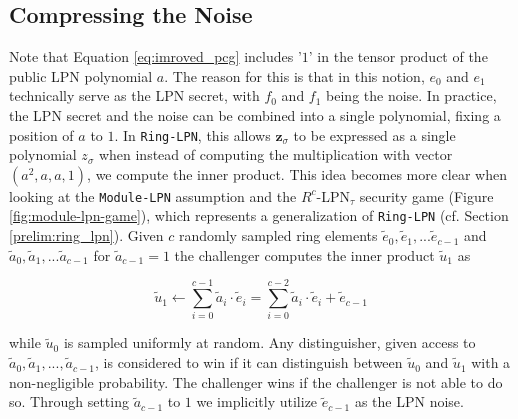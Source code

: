 \subsection{Compressing the Noise}
Note that Equation \ref{eq:imroved_pcg} includes '$1$' in the tensor product of the public LPN polynomial $a$. The reason for this is that in this notion, $e_0$ and $e_1$ technically serve as the LPN secret, with $f_0$ and $f_1$ being the noise. In practice, the LPN secret and the noise can be combined into a single polynomial, fixing a position of $a$ to $1$. In \texttt{Ring-LPN}, this allows $\mathbf{z}_\sigma$ to be expressed as a single polynomial $z_\sigma$ when instead of computing the multiplication with vector $(a^2, a, a, 1)$, we compute the inner product. This idea becomes more clear when looking at the \texttt{Module-LPN} assumption and the $R^{c}$-LPN$_{\tau}$ security game (Figure \ref{fig:module-lpn-game}), which represents a generalization of \texttt{Ring-LPN} (cf. Section \ref{prelim:ring_lpn}). Given $c$ randomly sampled ring elements $\tilde{e}_0, \tilde{e}_1, ... \tilde{e}_{c-1}$ and $\tilde{a}_0, \tilde{a}_1, ...\tilde{a}_{c-1}$ for $\tilde{a}_{c-1}=1$  the challenger computes the inner product $\tilde{u}_1$ as

\begin{equation}
\label{eq:inner_product_with_a_1}
\tilde{u}_{1} \leftarrow \sum_{i=0}^{c-1} \tilde{a}_{i} \cdot \tilde{e}_{i} = \sum_{i=0}^{c-2} \tilde{a}_{i} \cdot \tilde{e}_{i} + \tilde{e}_{c-1}
\end{equation}

while $\tilde{u}_0$ is sampled uniformly at random. Any distinguisher, given access to $\tilde{a}_0, \tilde{a}_1, ..., \tilde{a}_{c-1}$, is considered to win if it can distinguish between $\tilde{u}_0$ and $\tilde{u}_1$ with a non-negligible probability. The challenger wins if the challenger is not able to do so. Through setting $\tilde{a}_{c-1}$ to $1$ we implicitly utilize $\tilde{e}_{c-1}$ as the LPN noise.


